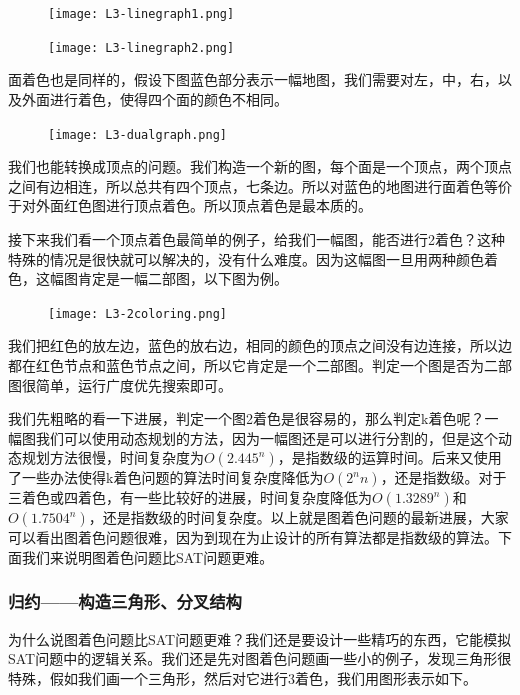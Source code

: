 \begin{figure}[H]
\centering
 \begin{minipage}{0.4\textwidth}
 \texttt{[image: L3-linegraph1.png]} 
 \end{minipage}
 \begin{minipage}{0.4\textwidth}
 \texttt{[image: L3-linegraph2.png]} 
 \end{minipage}
\end{figure}

面着色也是同样的，假设下图蓝色部分表示一幅地图，我们需要对左，中，右，以及外面进行着色，使得四个面的颜色不相同。

\begin{figure}[H]
\centering
\texttt{[image: L3-dualgraph.png]} 
\end{figure}

我们也能转换成顶点的问题。我们构造一个新的图，每个面是一个顶点，两个顶点之间有边相连，所以总共有四个顶点，七条边。所以对蓝色的地图进行面着色等价于对外面红色图进行顶点着色。所以顶点着色是最本质的。

接下来我们看一个顶点着色最简单的例子，给我们一幅图，能否进行2着色？这种特殊的情况是很快就可以解决的，没有什么难度。因为这幅图一旦用两种颜色着色，这幅图肯定是一幅二部图，以下图为例。

\begin{figure}[H]
\centering
\texttt{[image: L3-2coloring.png]} 
\end{figure}

我们把红色的放左边，蓝色的放右边，相同的颜色的顶点之间没有边连接，所以边都在红色节点和蓝色节点之间，所以它肯定是一个二部图。判定一个图是否为二部图很简单，运行广度优先搜索即可。

我们先粗略的看一下进展，判定一个图2着色是很容易的，那么判定k着色呢？一幅图我们可以使用动态规划的方法，因为一幅图还是可以进行分割的，但是这个动态规划方法很慢，时间复杂度为$O(2.445^n)$，是指数级的运算时间。后来又使用了一些办法使得k着色问题的算法时间复杂度降低为$O(2^nn)$，还是指数级。对于三着色或四着色，有一些比较好的进展，时间复杂度降低为$O(1.3289^n)$和$O(1.7504^n)$，还是指数级的时间复杂度。以上就是图着色问题的最新进展，大家可以看出图着色问题很难，因为到现在为止设计的所有算法都是指数级的算法。下面我们来说明图着色问题比SAT问题更难。

\subsubsection{归约——构造三角形、分叉结构}

为什么说图着色问题比SAT问题更难？我们还是要设计一些精巧的东西，它能模拟SAT问题中的逻辑关系。我们还是先对图着色问题画一些小的例子，发现三角形很特殊，假如我们画一个三角形，然后对它进行3着色，我们用图形表示如下。

